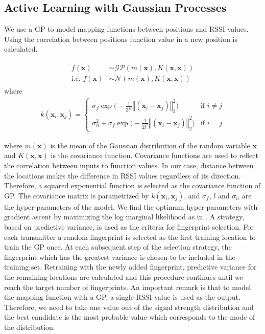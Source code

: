 \documentclass{article}
\newcommand{\x}{\mathbf{x}}
\begin{document}
	\subsection{Active Learning with Gaussian Processes}
	We use a GP to model mapping functions between positions and RSSI values. Using the correlation between positions function value in a new position is calculated. 
	\begin{small}
		\begin{align}
		\begin{split}
		f(\x) &\sim \mathcal{GP}(m(\x), K(\x,\x)) \\
		\text{i.e. \ } f(\x) &\sim \mathcal{N}(m(\x), K(\x,\x))
		\end{split}
		\label{eq:GPRMath}
		\end{align} where
		\begin{align}
		k(\x_i,\x_j) = 
		\left\{
		\begin{array}{ll}
		\sigma_f\exp\Big(-\frac{\displaystyle 1}{\displaystyle 2l^2}\left\Vert(\x_i-\x_j)\right\Vert^2_2 \Big)  & \mbox{if } i \neq j \\
		\sigma_n^2 + \sigma_f\exp\Big(-\frac{\displaystyle 1}{\displaystyle 2l^2}\left\Vert(\x_i-\x_j)\right\Vert^2_2 \Big) & \mbox{if } i = j
		\end{array}
		\right.
		\end{align}
	\end{small}
	where $m(\x)$ is the mean of the Gaussian distribution of the random variable $\x$ and $K(\x,\x)$ is the covariance function. Covariance functions are used to reflect the correlation between inputs to function values. In our case, distance between the locations makes the difference in RSSI values regardless of its direction. Therefore, a squared exponential function is selected as the covariance function of GP. The covariance matrix is parametrized by $k(\x_i,\x_j)$, and $\sigma_{f}$, $l$ and $\sigma_{n}$ are the hyper-parameters of the model. We find the optimum hyper-parameters with gradient ascent by maximizing the log marginal likelihood as in \cite{Ras2006}. A strategy, based on predictive variance, is used as the criteria for fingerprint selection. For each transmitter a random fingerprint is selected as the first training location to train the GP once. At each subsequent step of the selection strategy, the fingerprint which has the greatest variance is chosen to be included in the training set. Retraining with the newly added fingerprint, predictive variance for the remaining locations are calculated and this procedure continues until we reach the target number of fingerprints. An important remark is that to model the mapping function with a GP, a single RSSI value is used as the output. Therefore, we need to take one value out of the signal strength distribution and the best candidate is the most probable value which corresponds to the mode of the distribution. 
	
\end{document}
